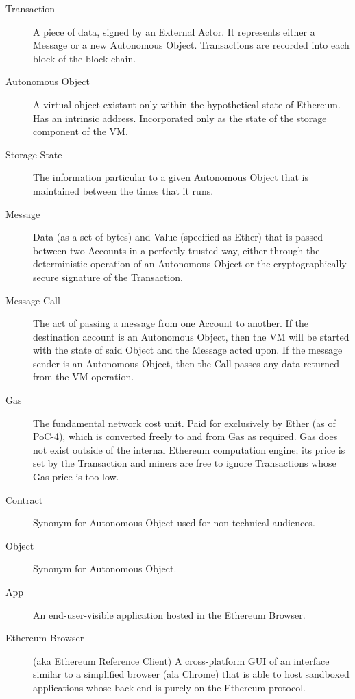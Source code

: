 \documentclass[9pt,oneside]{amsart}
\begin{document}
\begin{multicols}{2}
\begin{description}
\item[Transaction] A piece of data, signed by an External Actor. It represents either a Message or a new Autonomous Object. Transactions are recorded into each block of the block-chain.

\item[Autonomous Object] A virtual object existant only within the hypothetical state of Ethereum.  Has an intrinsic address. Incorporated only as the state of the storage component of the VM.

\item[Storage State] The information particular to a given Autonomous Object that is maintained between the times that it runs.

\item[Message] Data (as a set of bytes) and Value (specified as Ether) that is passed between two Accounts in a perfectly trusted way, either through the deterministic operation of an Autonomous Object or the cryptographically secure signature of the Transaction.

\item[Message Call] The act of passing a message from one Account to another. If the destination account is an Autonomous Object, then the VM will be started with the state of said Object and the Message acted upon. If the message sender is an Autonomous Object, then the Call passes any data returned from the VM operation.

\item[Gas] The fundamental network cost unit. Paid for exclusively by Ether (as of PoC-4), which is converted freely to and from Gas as required. Gas does not exist outside of the internal Ethereum computation engine; its price is set by the Transaction and miners are free to ignore Transactions whose Gas price is too low.

\item[Contract] Synonym for Autonomous Object used for non-technical audiences.

\item[Object] Synonym for Autonomous Object.

\item[App] An end-user-visible application hosted in the Ethereum Browser.

\item[Ethereum Browser] (aka Ethereum Reference Client) A cross-platform GUI of an interface similar to a simplified browser (ala Chrome) that is able to host sandboxed applications whose back-end is purely on the Ethereum protocol.


\end{description}
\end{multicols}
\end{document}
